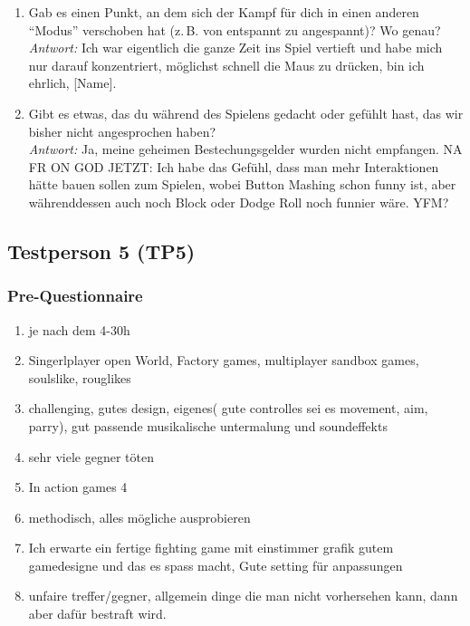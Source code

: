 \documentclass[../Main.tex]{subfiles}
\begin{document}
\begin{enumerate}[label=\textbf{I\arabic*}, leftmargin=1.5cm, itemsep=1em]
\item Gab es einen Punkt, an dem sich der Kampf für dich in einen anderen \enquote{Modus} verschoben hat (z.\,B. von entspannt zu angespannt)? Wo genau? \\
\textit{Antwort:} Ich war eigentlich die ganze Zeit ins Spiel vertieft und habe mich nur darauf konzentriert, möglichst schnell die Maus zu drücken, bin ich ehrlich, [Name].

\item Gibt es etwas, das du während des Spielens gedacht oder gefühlt hast, das wir bisher nicht angesprochen haben? \\
\textit{Antwort:} Ja, meine geheimen Bestechungsgelder wurden nicht empfangen. NA FR ON GOD JETZT: Ich habe das Gefühl, dass man mehr Interaktionen hätte bauen sollen zum Spielen, wobei Button Mashing schon funny ist, aber währenddessen auch noch Block oder Dodge Roll noch funnier wäre. YFM?
\end{enumerate}

\subsection{Testperson 5 (TP5)}

\subsubsection{Pre-Questionnaire}

\begin{enumerate}[label=\textbf{P\arabic*}, leftmargin=1.5cm, itemsep=0.5em]
\item je nach dem 4-30h
\item Singerlplayer open World, Factory games, multiplayer sandbox games, soulslike, rouglikes
\item challenging, gutes design, eigenes( gute controlles sei es movement, aim, parry), gut passende musikalische untermalung und soundeffekts
\item sehr viele gegner töten
\item In action games 4
\item methodisch, alles mögliche ausprobieren
\item Ich erwarte ein fertige fighting game mit einstimmer grafik gutem gamedesigne und das es spass macht, Gute setting für anpassungen
\item unfaire treffer/gegner, allgemein dinge die man nicht vorhersehen kann, dann aber dafür bestraft wird.
\end{enumerate}
\end{document}
